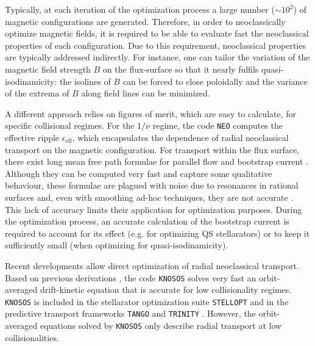 \documentclass[10pt]{iopart}
\begin{document}
Typically, at each iteration of the optimization process a large number ($\sim$$10^2$) of magnetic configurations are generated. Therefore, in order to neoclassically optimize magnetic fields, it is required to be able to evaluate fast the neoclassical properties of each configuration. Due to this requirement, neoclassical properties are typically addressed indirectly. For instance, one can tailor the variation of the magnetic field strength $B$ on the flux-surface so that it nearly fulfils quasi-isodinamicity: the isolines of $B$ can be forced to close poloidally and the variance of the extrema of $B$ along field lines can be minimized.

A different approach relies on figures of merit, which are easy to calculate, for specific collisional regimes. For the $1/\nu$ regime, the code {\texttt{NEO}} \cite{Nemov1999EvaluationO1} computes the effective ripple $\epsilon_{\text{eff}}$, which encapsulates the dependence of radial neoclassical transport on the magnetic configuration. For transport within the flux surface, there exist long mean free path formulae for parallel flow and bootstrap current \cite{Shaing-Callen-1983,Nakajima-1988,helander_parra_newton_2017}. Although they can be computed very fast and capture some qualitative behaviour, these formulae are plagued with noise due to resonances in rational surfaces and, even with smoothing ad-hoc techniques, they are not accurate \cite{Landreman_SelfConsistent}. This lack of accuracy limits their application for optimization purposes. During the optimization process, an accurate calculation of the bootstrap current is required to account for its effect (e.g. for optimizing QS stellarators) or to keep it sufficiently small (when optimizing for quasi-isodinamicity). 

Recent developments allow direct optimization of radial neoclassical transport. Based on previous derivations \cite{Calvo_2017,dherbemont2022}, the code {\texttt{KNOSOS}} \cite{KNOSOSJCP,KNOSOSJPP} solves very fast an orbit-averaged drift-kinetic equation that is accurate for low collisionality regimes. {\texttt{KNOSOS}} is included in the stellarator optimization suite \texttt{STELLOPT} \cite{STELLOPT} and in the predictive transport frameworks {\texttt{TANGO}} \cite{Banon_Navarro_2023} and \texttt{TRINITY} \cite{Barnes_Trinity_2010}. However, the orbit-averaged equations solved by {\texttt{KNOSOS}} only describe radial transport at low collisionalities. 
\end{document}
